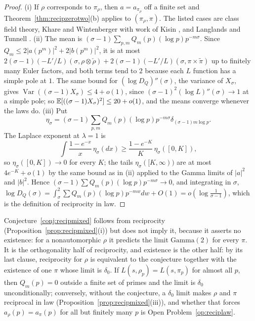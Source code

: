 \begin{proof}
(i) If $\rho$ corresponds to $\pi_\rho$, then $a=a_{\pi_\rho}$ off a finite set and Theorem~\ref{thm:recipzerotwo}(b) applies to $(\pi_\rho,\pi)$. The listed cases are class field theory, Khare and Wintenberger \cite{kharewintenberger2009,kharewintenberger2009b} with work of Kisin \cite{kisin2009}, and Langlands and Tunnell \cite{langlands1980,tunnell1981}. (ii) The mean is $(\sigma-1)\sum_{p,m}Q_m(p)(\log p)p^{-m\sigma}$. Since $Q_m\le2|a(p^m)|^2+2|b(p^m)|^2$, it is at most $2(\sigma-1)(-L'/L)(\sigma,\rho\otimes\check\rho)+2(\sigma-1)(-L'/L)(\sigma,\pi\times\tilde\pi)$ up to finitely many Euler factors, and both terms tend to $2$ because each $L$ function has a simple pole at $1$. The same bound for $(\log D_Q)''(\sigma)$, the variance of $X_\sigma$, gives $\operatorname{Var}((\sigma-1)X_\sigma)\le4+o(1)$, since $(\sigma-1)^2(\log L)''(\sigma)\to1$ at a simple pole; so $\mathbb{E}[((\sigma-1)X_\sigma)^2]\le20+o(1)$, and the means converge whenever the laws do. (iii) Put
\[
\eta_\sigma=(\sigma-1)\sum_{p,m}Q_m(p)(\log p)p^{-m\sigma}\delta_{(\sigma-1)m\log p}.
\]
The Laplace exponent at $\lambda=1$ is
\[
\int\frac{1-e^{-x}}x\,\eta_\sigma(dx)\ge\frac{1-e^{-K}}K\,\eta_\sigma([0,K]),
\]
so $\eta_\sigma([0,K])\to0$ for every $K$; the tails $\eta_\sigma([K,\infty))$ are at most $4e^{-K}+o(1)$ by the same bound as in (ii) applied to the Gamma limits of $|a|^2$ and $|b|^2$. Hence $(\sigma-1)\sum Q_m(p)(\log p)p^{-m\sigma}\to0$, and integrating in $\sigma$, $\log D_Q(\sigma)=\int_\sigma^2\sum Q_m(p)(\log p)p^{-mw}dw+O(1)=o(\log\frac1{\sigma-1})$, which is the definition of reciprocity in law.
\end{proof}

Conjecture~\ref{conj:recipmixed} follows from reciprocity (Proposition~\ref{prop:recipmixed}(i)) but does not imply it, because it asserts no existence: for a nonautomorphic $\rho$ it predicts the limit $\mathrm{Gamma}(2)$ for every $\pi$. It is the orthogonality half of reciprocity, and existence is the other half: by its last clause, reciprocity for $\rho$ is equivalent to the conjecture together with the existence of one $\pi$ whose limit is $\delta_0$. If $L(s,\rho_p)=L(s,\pi_p)$ for almost all $p$, then $Q_m(p)=0$ outside a finite set of primes and the limit is $\delta_0$ unconditionally; conversely, without the conjecture, a $\delta_0$ limit makes $\rho$ and $\pi$ reciprocal in law (Proposition~\ref{prop:recipmixed}(iii)), and whether that forces $a_\rho(p)=a_\pi(p)$ for all but finitely many $p$ is Open Problem~\ref{op:reciplaw}.


